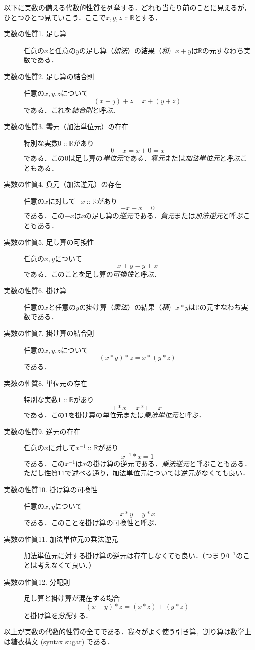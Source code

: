\documentclass[twocolumn]{jsbook}
\newcommand{\keyword}[1]{{\emph{#1}}}
\DeclareMathOperator{\mathIn}{::}
\newcommand{\mathSpecialSet}[1]{\mathbb{#1}}
\begin{document}
以下に実数の備える代数的性質を列挙する．どれも当たり前のことに見えるが，ひとつひとつ見ていこう．ここで$x,y,z\mathIn\mathSpecialSet{R}$とする．
\begin{description}
\item[実数の性質1. 足し算] 任意の$x$と任意の$y$の足し算（\keyword{加法}）の結果（\keyword{和}）$x+y$は$\mathSpecialSet{R}$の元すなわち実数である．
\item[実数の性質2. 足し算の結合則] 任意の$x,y,z$について$$(x+y)+z=x+(y+z)$$である．これを\keyword{結合則}と呼ぶ．
\item[実数の性質3. 零元（加法単位元）の存在] 特別な実数$0\mathIn\mathSpecialSet{R}$があり$$0+x=x+0=x$$である．この$0$は足し算の\keyword{単位元}である．\keyword{零元}または\keyword{加法単位元}と呼ぶこともある．
\item[実数の性質4. 負元（加法逆元）の存在] 任意の$x$に対して$-x\mathIn\mathSpecialSet{R}$があり$$-x+x=0$$である．この$-x$は$x$の足し算の\keyword{逆元}である．\keyword{負元}または\keyword{加法逆元}と呼ぶこともある．
\item[実数の性質5. 足し算の可換性] 任意の$x,y$について$$x+y=y+x$$である．このことを足し算の\keyword{可換性}と呼ぶ．
\item[実数の性質6. 掛け算] 任意の$x$と任意の$y$の掛け算（\keyword{乗法}）の結果（\keyword{積}）$x*y$は$\mathSpecialSet{R}$の元すなわち実数である．
\item[実数の性質7. 掛け算の結合則] 任意の$x,y,z$について$$(x*y)*z=x*(y*z)$$である．
\item[実数の性質8. 単位元の存在] 特別な実数$1\mathIn\mathSpecialSet{R}$があり$$1*x=x*1=x$$である．この$1$を掛け算の単位元または\keyword{乗法単位元}と呼ぶ．
\item[実数の性質9. 逆元の存在] 任意の$x$に対して$x^{-1}\mathIn\mathSpecialSet{R}$があり$$x^{-1}*x=1$$である．この$x^{-1}$は$x$の掛け算の逆元である．\keyword{乗法逆元}と呼ぶこともある．ただし性質11で述べる通り，加法単位元については逆元がなくても良い．
\item[実数の性質10. 掛け算の可換性] 任意の$x,y$について$$x*y=y*x$$である．このことを掛け算の可換性と呼ぶ．
\item[実数の性質11. 加法単位元の乗法逆元] 加法単位元に対する掛け算の逆元は存在しなくても良い．（つまり$0^{-1}$のことは考えなくて良い．）
\item[実数の性質12. 分配則] 足し算と掛け算が混在する場合$$(x+y)*z=(x*z)+(y*z)$$と掛け算を\keyword{分配}する．
\end{description}
以上が実数の代数的性質の全てである．我々がよく使う引き算，割り算は数学上は糖衣構文 (syntax sugar) である．
\end{document}
